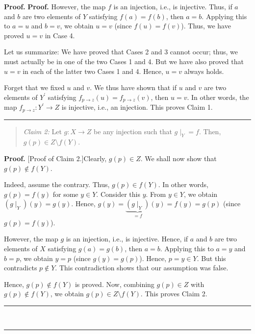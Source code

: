 \documentclass[numbers=enddot,12pt,final,onecolumn,notitlepage]{scrartcl}%
\numberwithin{exer}{section}
\theoremstyle{definition}
\newenvironment{statement}{\begin{quote}}{\end{quote}}
\newenvironment{proof}[1][Proof]{\noindent\textbf{#1.} }{\ \rule{0.5em}{0.5em}}
\newenvironment{verlong}{}{}
\begin{document}
\begin{verlong}
\begin{proof}
\begin{proof}
However, the map $f$ is an injection, i.e., is injective. Thus, if $a$ and $b$
are two elements of $Y$ satisfying $f\left(  a\right)  =f\left(  b\right)  $,
then $a=b$. Applying this to $a=u$ and $b=v$, we obtain $u=v$ (since $f\left(
u\right)  =f\left(  v\right)  $). Thus, we have proved $u=v$ in Case 4.

Let us summarize: We have proved that Cases 2 and 3 cannot occur; thus, we
must actually be in one of the two Cases 1 and 4. But we have also proved that
$u=v$ in each of the latter two Cases 1 and 4. Hence, $u=v$ always holds.

Forget that we fixed $u$ and $v$. We thus have shown that if $u$ and $v$ are
two elements of $Y^{\prime}$ satisfying $f_{p\rightarrow z}\left(  u\right)
=f_{p\rightarrow z}\left(  v\right)  $, then $u=v$. In other words, the map
$f_{p\rightarrow z}:Y^{\prime}\rightarrow Z$ is injective, i.e., an injection.
This proves Claim 1.
\end{proof}

\begin{statement}
\textit{Claim 2:} Let $g:X\rightarrow Z$ be any injection such that $\left.
g\mid_{Y}\right.  =f$. Then, $g\left(  p\right)  \in Z\setminus f\left(
Y\right)  $.
\end{statement}

\begin{proof}
[Proof of Claim 2.]Clearly, $g\left(  p\right)  \in Z$. We shall now show that
$g\left(  p\right)  \notin f\left(  Y\right)  $.

Indeed, assume the contrary. Thus, $g\left(  p\right)  \in f\left(  Y\right)
$. In other words, $g\left(  p\right)  =f\left(  y\right)  $ for some $y\in
Y$. Consider this $y$. From $y\in Y$, we obtain $\left(  g\mid_{Y}\right)
\left(  y\right)  =g\left(  y\right)  $. Hence, $g\left(  y\right)
=\underbrace{\left(  g\mid_{Y}\right)  }_{=f}\left(  y\right)  =f\left(
y\right)  =g\left(  p\right)  $ (since $g\left(  p\right)  =f\left(  y\right)
$).

However, the map $g$ is an injection, i.e., is injective. Hence, if $a$ and
$b$ are two elements of $X$ satisfying $g\left(  a\right)  =g\left(  b\right)
$, then $a=b$. Applying this to $a=y$ and $b=p$, we obtain $y=p$ (since
$g\left(  y\right)  =g\left(  p\right)  $). Hence, $p=y\in Y$. But this
contradicts $p\notin Y$. This contradiction shows that our assumption was false.

Hence, $g\left(  p\right)  \notin f\left(  Y\right)  $ is proved. Now,
combining $g\left(  p\right)  \in Z$ with $g\left(  p\right)  \notin f\left(
Y\right)  $, we obtain $g\left(  p\right)  \in Z\setminus f\left(  Y\right)
$. This proves Claim 2.
\end{proof}


\end{proof}
\end{verlong}
\end{document}
